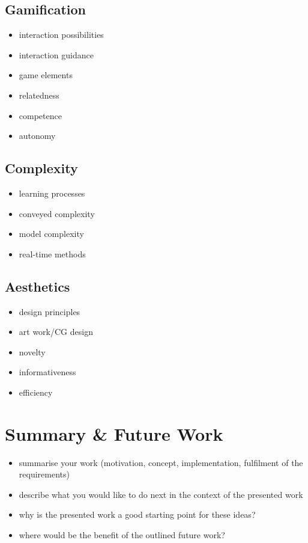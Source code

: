\documentclass{sig-alternate-05-2015}
\begin{document}
\subsection{Gamification}
\begin{itemize}
\item interaction possibilities
\item interaction guidance
\item game elements
\item relatedness
\item competence
\item autonomy
\end{itemize}

\subsection{Complexity}
\begin{itemize}
\item learning processes
\item conveyed complexity
\item model complexity
\item real-time methods
\end{itemize}

\subsection{Aesthetics}
\begin{itemize}
\item design principles
\item art work/CG design
\item novelty
\item informativeness
\item efficiency
\end{itemize}

\section{Summary \& Future Work}
\begin{itemize}
\item summarise your work (motivation, concept, implementation, fulfilment of the requirements)
\item describe what you would like to do next in the context of the presented work
\item why is the presented work a good starting point for these ideas?
\item where would be the benefit of the outlined future work?
\end{itemize}

\nocite{Goldsmith:2010kx,Lilleyman:1995fk,Rogers:2007vn,Snieder:2009ys}


  
\end{document}
